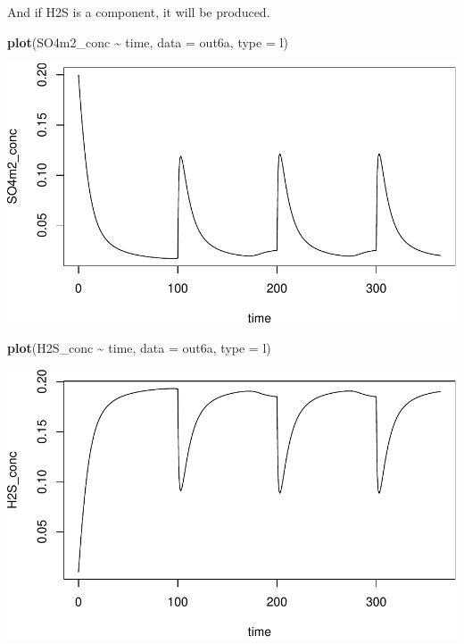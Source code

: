 \documentclass[
]{article}
\newenvironment{Shaded}{\begin{snugshade}}{\end{snugshade}}
\newcommand{\AttributeTok}[1]{\textcolor[rgb]{0.13,0.29,0.53}{#1}}
\newcommand{\FunctionTok}[1]{\textcolor[rgb]{0.13,0.29,0.53}{\textbf{#1}}}
\newcommand{\NormalTok}[1]{#1}
\newcommand{\SpecialCharTok}[1]{\textcolor[rgb]{0.81,0.36,0.00}{\textbf{#1}}}
\newcommand{\StringTok}[1]{\textcolor[rgb]{0.31,0.60,0.02}{#1}}
\begin{document}
And if H2S is a component, it will be produced.

\begin{Shaded}
\begin{Highlighting}[]
\FunctionTok{plot}\NormalTok{(SO4m2\_conc }\SpecialCharTok{\textasciitilde{}}\NormalTok{ time, }\AttributeTok{data =}\NormalTok{ out6a, }\AttributeTok{type =} \StringTok{\textquotesingle{}l\textquotesingle{}}\NormalTok{)}
\end{Highlighting}
\end{Shaded}

\includegraphics{simple_demo_files/figure-latex/unnamed-chunk-42-1.pdf}

\begin{Shaded}
\begin{Highlighting}[]
\FunctionTok{plot}\NormalTok{(H2S\_conc }\SpecialCharTok{\textasciitilde{}}\NormalTok{ time, }\AttributeTok{data =}\NormalTok{ out6a, }\AttributeTok{type =} \StringTok{\textquotesingle{}l\textquotesingle{}}\NormalTok{)}
\end{Highlighting}
\end{Shaded}

\includegraphics{simple_demo_files/figure-latex/unnamed-chunk-42-2.pdf}
\end{document}
